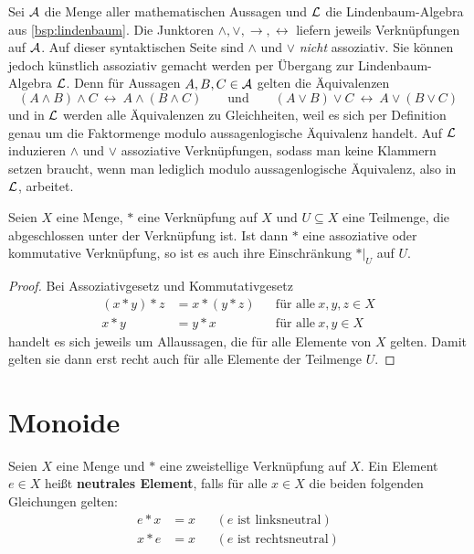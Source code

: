 \begin{bem}
    Sei $\mathcal A$ die Menge aller mathematischen Aussagen und $\mathcal L$ die Lindenbaum-Algebra aus \cref{bsp:lindenbaum}. Die Junktoren $\land,\lor,\to,\leftrightarrow$ liefern jeweils Verknüpfungen auf $\mathcal A$. Auf dieser syntaktischen Seite sind $\land$ und $\lor$ \emph{nicht} assoziativ. Sie können jedoch künstlich assoziativ gemacht werden per Übergang zur Lindenbaum-Algebra $\mathcal L$. Denn für Aussagen $A,B,C\in \mathcal A$ gelten die Äquivalenzen
        \[ (A\land B)\land C\ \leftrightarrow\ A\land (B\land C)\qquad\text{und}\qquad (A\lor B)\lor C\ \leftrightarrow\ A\lor (B\lor C) \]
    und in $\mathcal L$ werden alle Äquivalenzen zu Gleichheiten, weil es sich per Definition genau um die Faktormenge modulo aussagenlogische Äquivalenz handelt. Auf $\mathcal L$ induzieren $\land$ und $\lor$ assoziative Verknüpfungen, sodass man keine Klammern setzen braucht, wenn man lediglich modulo aussagenlogische Äquivalenz, also in $\mathcal L$, arbeitet.
\end{bem}


\begin{satz} \label{verknuepfeigstabil}
    Seien $X$ eine Menge, $*$ eine Verknüpfung auf $X$ und $U\subseteq X$ eine Teilmenge, die abgeschlossen unter der Verknüpfung ist. Ist dann $*$ eine assoziative oder kommutative Verknüpfung, so ist es auch ihre Einschränkung $*\vert_U$ auf $U$.
\end{satz}
\begin{proof}
    Bei Assoziativgesetz und Kommutativgesetz
    \begin{align*}
        (x*y)*z & = x*(y*z) && \text{für alle}\ x,y,z\in X \\
        x*y & = y*x && \text{für alle}\ x,y\in X
    \end{align*}
    handelt es sich jeweils um Allaussagen, die für alle Elemente von $X$ gelten. Damit gelten sie dann erst recht auch für alle Elemente der Teilmenge $U$.
\end{proof}





\section{Monoide}


\begin{defin} \label{def:neutrales} 
    Seien $X$ eine Menge und $*$ eine zweistellige Verknüpfung auf $X$. Ein Element $e\in X$ heißt \textbf{neutrales Element}, falls für alle $x\in X$ die beiden folgenden Gleichungen gelten:
    \begin{align*}
        e*x & = x && (\text{$e$ ist linksneutral}) \\
        x*e & = x && (\text{$e$ ist rechtsneutral})
    \end{align*}
\end{defin}


